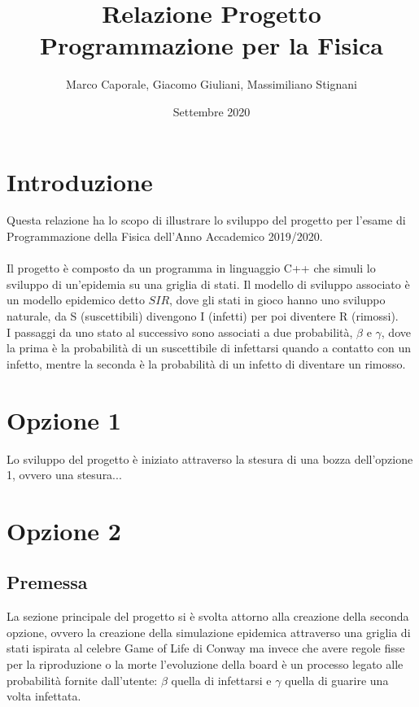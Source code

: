 \documentclass[a4paper]{article}
\begin{document}
\title{Relazione Progetto Programmazione per la Fisica}
\author{Marco Caporale, Giacomo Giuliani, Massimiliano Stignani}
\date{Settembre 2020}
\maketitle

\section{Introduzione}
Questa relazione ha lo scopo di illustrare lo sviluppo del progetto per l'esame di Programmazione della Fisica dell'Anno Accademico 2019/2020. \\ \\ Il progetto è composto da un programma in linguaggio C++ che simuli lo sviluppo di un'epidemia su una griglia di stati. Il modello di sviluppo associato è un modello epidemico detto $SIR$, dove gli stati in gioco hanno uno sviluppo naturale, da S (suscettibili) divengono I (infetti) per poi diventere R (rimossi). \\ I passaggi da uno stato al successivo sono associati a
due probabilità, $\beta$ e $\gamma$, dove la prima è la probabilità di un suscettibile di infettarsi quando a contatto con un infetto, mentre la seconda è la probabilità di un infetto di diventare un rimosso. \\ 

\section{Opzione 1}
Lo sviluppo del progetto è iniziato attraverso la stesura di una  bozza dell'opzione 1, ovvero una stesura... %


\section{Opzione 2}
\subsection{Premessa}
La sezione principale del progetto si è svolta attorno alla creazione della seconda opzione, ovvero la creazione della simulazione epidemica attraverso una griglia di stati ispirata al celebre Game of Life di Conway ma invece che avere regole fisse per la riproduzione o la morte l'evoluzione della board è un processo legato alle probabilità fornite dall'utente: $\beta$ quella di infettarsi e $\gamma$ quella di guarire una volta infettata.\\ 
\end{document}
